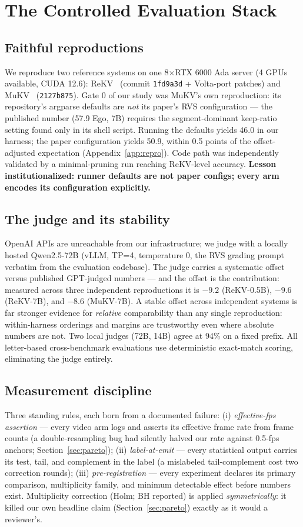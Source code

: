 \section{The Controlled Evaluation Stack}
\label{sec:stack}

\subsection{Faithful reproductions}
We reproduce two reference systems on one 8$\times$RTX 6000 Ada server (4 GPUs available, CUDA 12.6): ReKV~\cite{rekv} (commit \texttt{1fd9a3d} + Volta-port patches) and MuKV~\cite{mukv} (\texttt{2127b875}). Gate 0 of our study was MuKV's own reproduction: its repository's argparse defaults are \emph{not} its paper's RVS configuration — the published number (57.9 Ego, 7B) requires the segment-dominant keep-ratio setting found only in its shell script. Running the defaults yields 46.0 in our harness; the paper configuration yields 50.9, within 0.5 points of the offset-adjusted expectation (Appendix~\ref{app:repro}). Code path was independently validated by a minimal-pruning run reaching ReKV-level accuracy. \textbf{Lesson institutionalized: runner defaults are not paper configs; every arm encodes its configuration explicitly.}

\subsection{The judge and its stability}
OpenAI APIs are unreachable from our infrastructure; we judge with a locally hosted Qwen2.5-72B (vLLM, TP=4, temperature 0, the RVS grading prompt verbatim from the evaluation codebase). The judge carries a systematic offset versus published GPT-judged numbers — and the offset is the contribution: measured across three independent reproductions it is $-9.2$ (ReKV-0.5B), $-9.6$ (ReKV-7B), and $-8.6$ (MuKV-7B). A stable offset across independent systems is far stronger evidence for \emph{relative} comparability than any single reproduction: within-harness orderings and margins are trustworthy even where absolute numbers are not. Two local judges (72B, 14B) agree at 94\% on a fixed prefix. All letter-based cross-benchmark evaluations use deterministic exact-match scoring, eliminating the judge entirely.

\subsection{Measurement discipline}
Three standing rules, each born from a documented failure: (i) \emph{effective-fps assertion} — every video arm logs and asserts its effective frame rate from frame counts (a double-resampling bug had silently halved our rate against 0.5-fps anchors; Section~\ref{sec:pareto}); (ii) \emph{label-at-emit} — every statistical output carries its test, tail, and complement in the label (a mislabeled tail-complement cost two correction rounds); (iii) \emph{pre-registration} — every experiment declares its primary comparison, multiplicity family, and minimum detectable effect before numbers exist. Multiplicity correction (Holm; BH reported) is applied \emph{symmetrically}: it killed our own headline claim (Section~\ref{sec:pareto}) exactly as it would a reviewer's.


